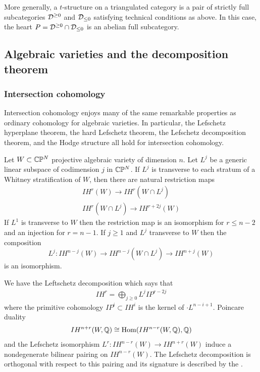 \begin{remark}
    More generally, a $t$-structure on a 
    triangulated category is a pair of strictly full subcategories ${\mathcal{D}}^{\geq 0}$
    and ${\mathcal{D}}_{\leq 0}$ satisfying technical
    conditions as above. In this case, the heart $P = {\mathcal{D}}^{\geq 0}\cap {\mathcal{D}}_{\leq 0}$ 
    is an abelian full subcategory.
\end{remark}

\subsection{Algebraic varieties and the decomposition theorem}
\subsubsection{Intersection cohomology}
Intersection cohomology enjoys many of the same remarkable properties as ordinary
cohomology for algebraic varieties. In particular, the Lefschetz hyperplane theorem,
the hard Lefschetz theorem, the Lefschetz decomposition theorem, and the 
Hodge structure all hold for intersection cohomology.

\begin{theorem}
    Let $W\subset \mathbb{C}\mathbb{P}^N$ projective algebraic variety of dimension $n$. 
    Let $L^j$ be a generic linear subspace of codimension $j$ in $\mathbb{C}\mathbb{P}^N$.
    If $L^j$ is transverse to each stratum of a Whitney stratification of $W$,
    then there are natural restriction maps \begin{align*}
        IH^r(W) \to IH^r(W\cap L^j) \\
        IH^r(W\cap L^j) \to IH^{r+2j}(W)
    \end{align*} If $L^1$ is transverse to $W$ then 
    the restriction map is an isomorphism for $r\leq n-2$ and an injection for $r = n-1$.
    If $j\geq 1$ and $L^j$ transverse to $W$ then the composition 
    \[L^j:IH^{n-j}(W) \to IH^{n-j}(W\cap L^j) \to IH^{n+j}(W)\] is an isomorphism.
\end{theorem}

\begin{theorem}
    We have the Leftschetz decomposition which says that \begin{align*}
        IH^r = \bigoplus_{j\geq 0} L^jIP^{r-2j}
    \end{align*} where the primitive cohomology 
    $IP^i\subset IH^i$ is the kernel of $\cdot L^{n-i+1}$. Poincare duality \begin{align*}
        IH^{n+r}(W,\mathbb{Q}) \cong \operatorname{Hom}(IH^{n-r}(W,\mathbb{Q}),\mathbb{Q})
    \end{align*} and the Lefschetz isomorphism $L^r: IH^{n-r}(W) \to IH^{n+r}(W)$ 
    induce a nondegenerate bilinear pairing on $IH^{n-r}(W)$. The Lefschetz decomposition is orthogonal 
    with respect to this pairing and its signature is described by the 
    .
\end{theorem}

